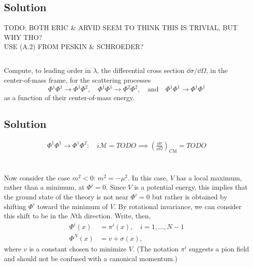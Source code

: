 \subsection*{Solution}
TODO: BOTH ERIC \& ARVID SEEM TO THINK THIS IS TRIVIAL, BUT WHY THO?\\
USE (A.2) FROM PESKIN \& SCHROEDER?




\subsection{}
Compute, to leading order in $\lambda$, the differential cross section $\dd \sigma / \dd \Omega$, in the center-of-mass frame, for the scattering processes
\begin{equation*}
    \Phi^1 \Phi^1 \to \Phi^1 \Phi^2, \quad \Phi^1 \Phi^1 \to \Phi^2 \Phi^2, \quad \textrm{and} \quad \Phi^1 \Phi^1 \to \Phi^1 \Phi^1
\end{equation*}{}
as a function of their center-of-mass energy.


\subsection*{Solution}
\begin{align*}
	\Phi^1 \Phi^1 \to \Phi^1 \Phi^2 : \quad i \mathcal{M} = TODO \implies \left( \frac{\dd \sigma}{\dd \Omega} \right)_\mathrm{CM} = TODO
\end{align*}





\section{}
Now consider the case $m^2 < 0$: $m^2 = -\mu^2$. In this case, $V$ has a local maximum, rather than a minimum, at $\Phi^i = 0$. Since $V$ is a potential energy, this implies that the ground state of the theory is not near $\Phi^i = 0$ but rather is obtained by shifting $\Phi^i$ toward the minimum of $V$. By rotational invariance, we can consider this shift to be in the $N$th direction. Write, then,
\begin{align*}
    \Phi^i(x) &= \pi^i(x), \quad i = 1, \dots, N -1\\
    \Phi^N(x) &= v + \sigma(x),
\end{align*}{}
where $v$ is a constant chosen to minimize $V$. (The notation $\pi^i$ suggests a pion field and should not be confused with a canonical momentum.)

